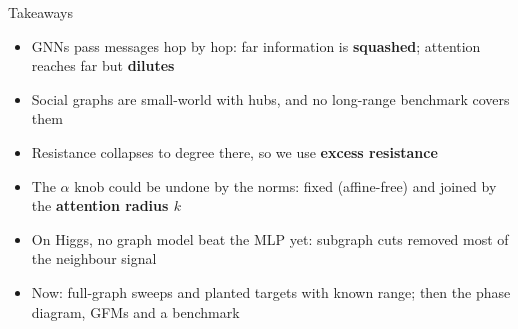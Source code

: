 \documentclass[aspectratio=169,10pt]{beamer}
\begin{document}
\begin{frame}{Takeaways}
  \begin{itemize}
    \item GNNs pass messages hop by hop: far information is \textbf{squashed}; attention reaches far but \textbf{dilutes}
    \item Social graphs are small-world with hubs, and no long-range benchmark covers them
    \item Resistance collapses to degree there, so we use \textbf{excess resistance}
    \item The $\alpha$ knob could be undone by the norms: fixed (affine-free) and joined by the \textbf{attention radius $k$}
    \item On Higgs, no graph model beat the MLP yet: \alert{subgraph cuts removed most of the neighbour signal}
    \item Now: full-graph sweeps and planted targets with known range; then the phase diagram, GFMs and a benchmark
  \end{itemize}
\end{frame}
\end{document}

